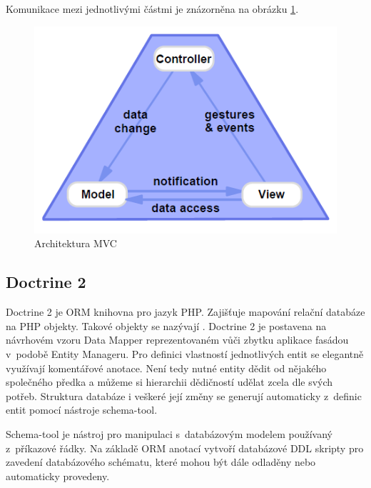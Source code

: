 \documentclass[thesis=B,czech]{FITthesis}[2012/06/26]
\begin{document}
	Komunikace mezi jednotlivými částmi je znázorněna na obrázku \ref{mvc_arch}.

	\begin{figure}
		\includegraphics[width=\textwidth]{mvc.png}
		\caption{Architektura MVC}\label{mvc_arch}
	\end{figure}
	
\subsection{Doctrine 2}
	Doctrine 2 je ORM knihovna pro jazyk PHP. Zajišťuje mapování relační databáze na PHP objekty. Takové objekty se nazývají . Doctrine 2 je postavena na návrhovém vzoru Data Mapper reprezentovaném vůči zbytku aplikace fasádou v~podobě Entity Manageru. Pro definici vlastností jednotlivých entit se elegantně využívají komentářové anotace. Není tedy nutné entity dědit od nějakého společného předka a můžeme si hierarchii dědičností udělat zcela dle svých potřeb. Struktura databáze i veškeré její změny se generují automaticky z~definic entit pomocí nástroje schema-tool. \cite{doctrine2} 
	
	Schema-tool je nástroj pro manipulaci s~databázovým modelem používaný z~příkazové řádky. Na základě ORM anotací vytvoří databázové DDL skripty pro zavedení databázového schématu, které mohou být dále odladěny nebo automaticky provedeny.
	
\end{document}
